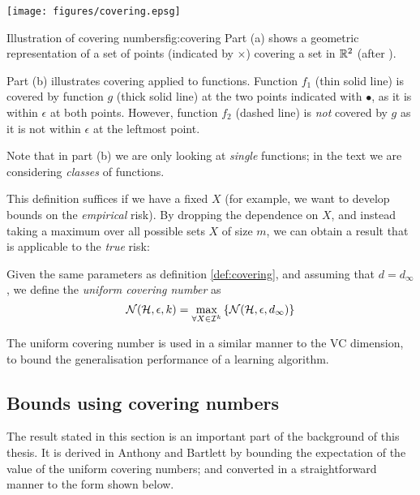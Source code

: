 \begin{linefigure}
\begin{center}
\texttt{[image: figures/covering.epsg]}
\end{center}
\begin{capt}{Illustration of covering numbers}{fig:covering}
Part (a) shows a geometric representation of a set of points
(indicated by $\times$) covering a set in $\mathbb{R}^2$ (after
\cite{Anthony98}).

Part (b) illustrates covering applied to functions.  Function $f_1$
(thin solid line) is covered by function $g$ (thick solid line) at the two
points indicated with $\bullet$, as it is within $\epsilon$ at both
points. However, function $f_2$ (dashed line) is \emph{not} covered by
$g$ as it is not within $\epsilon$ at the leftmost point.

Note that in part (b) we are only looking at \emph{single} functions;
in the text we are considering \emph{classes} of functions.
\end{capt}
\end{linefigure}

This definition suffices if we have a fixed $X$ (for example, we want
to develop bounds on the \emph{empirical} risk).  By dropping the
dependence on $X$, and instead taking a maximum over all possible sets
$X$ of size $m$, we can obtain a result that is applicable to the
\emph{true} risk: 

\begin{definition}
Given the same parameters as definition \ref{def:covering}, and
assuming that $d = d_{\infty}$, we define
the \emph{uniform covering number} as
\begin{equation}
\label{eqn:uniform covering numbers}
\mathcal{N}({\mathcal{H}}, {\epsilon}, {k}) = \max_{\forall X \in \mathcal{I}^k} \left\{
\mathcal{N}({\mathcal{H}}, {\epsilon}, {d_{\infty}}) \right\} 
\end{equation}
\end{definition}

The uniform covering number is used in a similar manner to the VC
dimension, to bound the generalisation performance of a learning
algorithm. 

\subsection{Bounds using covering numbers}
\label{sec:covering number bounds}

The result stated in this section is an important part of the
background of this thesis.  It is derived in Anthony and Bartlett
\cite{Anthony98} by bounding the expectation of the value of the
uniform covering numbers; and converted in a straightforward manner to
the form shown below.

